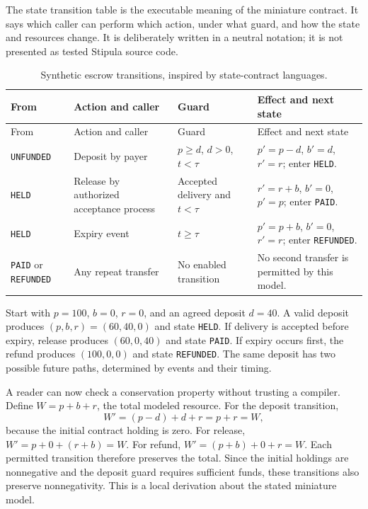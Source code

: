 \documentclass[12pt,a4paper,oneside,openany]{book}
\begin{document}
The state transition table is the executable meaning of the miniature contract.
It says which caller can perform which action, under what guard, and how the
state and resources change. It is deliberately written in a neutral notation;
it is not presented as tested Stipula source code.

\begin{longtable}{@{}P{24mm}P{33mm}P{42mm}P{48mm}@{}}
\caption{Synthetic escrow transitions, inspired by state-contract languages.}\\
\toprule
From & Action and caller & Guard & Effect and next state\\\midrule\endfirsthead
\toprule From & Action and caller & Guard & Effect and next state\\\midrule\endhead
\texttt{UNFUNDED} & Deposit by payer & $p\geq d$, $d>0$, $t<\tau$ & $p'=p-d$, $b'=d$, $r'=r$; enter \texttt{HELD}.\\
\texttt{HELD} & Release by authorized acceptance process & Accepted delivery and $t<\tau$ & $r'=r+b$, $b'=0$, $p'=p$; enter \texttt{PAID}.\\
\texttt{HELD} & Expiry event & $t\geq\tau$ & $p'=p+b$, $b'=0$, $r'=r$; enter \texttt{REFUNDED}.\\
\texttt{PAID} or \texttt{REFUNDED} & Any repeat transfer & No enabled transition & No second transfer is permitted by this model.\\
\bottomrule
\end{longtable}

Start with $p=100$, $b=0$, $r=0$, and an agreed deposit $d=40$. A valid deposit
produces $(p,b,r)=(60,40,0)$ and state \texttt{HELD}. If delivery is accepted before
expiry, release produces $(60,0,40)$ and state \texttt{PAID}. If expiry occurs
first, the refund produces $(100,0,0)$ and state \texttt{REFUNDED}. The same deposit
has two possible future paths, determined by events and their timing.

A reader can now check a conservation property without trusting a compiler. Define
$W=p+b+r$, the total modeled resource. For the deposit transition,
\begin{equation}
 W'=(p-d)+d+r=p+r=W,
 \label{eq:escrow-deposit}
\end{equation}
because the initial contract holding is zero. For release,
$W'=p+0+(r+b)=W$. For refund, $W'=(p+b)+0+r=W$. Each permitted transition therefore
preserves the total. Since the initial holdings are nonnegative and the deposit
guard requires sufficient funds, these transitions also preserve nonnegativity.
This is a local derivation about the stated miniature model.
\end{document}
